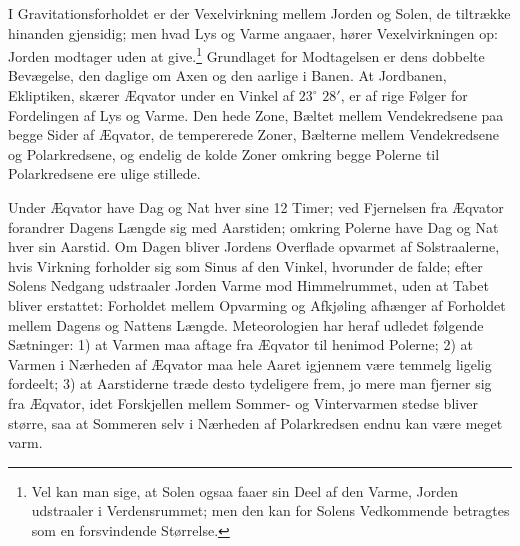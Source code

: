 \documentclass[12pt,a4paper]{book}
\begin{document}
I Gravitationsforholdet er der Vexelvirkning mellem Jorden og Solen, de
tiltrække hinanden gjensidig; men hvad Lys og Varme angaaer, hører
Vexelvirkningen op: Jorden modtager uden at give.\footnote{Vel kan man
sige, at Solen ogsaa faaer sin Deel af den Varme, Jorden udstraaler i
Verdensrummet; men den kan for Solens Vedkommende betragtes som en
forsvindende Størrelse.} Grundlaget for Modtagelsen er dens dobbelte
Bevægelse, den daglige om Axen og den aarlige i Banen. At Jordbanen,
Ekliptiken, skærer Æqvator
under en Vinkel af $23^{\circ}$ $28'$, er af rige Følger for Fordelingen af
Lys og Varme. Den hede Zone, Bæltet mellem Vendekredsene paa begge Sider
af Æqvator, de tempererede Zoner, Bælterne mellem Vendekredsene og
Polarkredsene, og endelig de kolde Zoner omkring begge Polerne til
Polarkredsene ere ulige stillede.

Under Æqvator have Dag og Nat hver sine 12 Timer; ved Fjernelsen fra
Æqvator forandrer Dagens Længde sig med Aarstiden; omkring Polerne have
Dag og Nat hver sin Aarstid. Om Dagen bliver Jordens Overflade opvarmet
af Solstraalerne, hvis Virkning forholder sig som Sinus af den Vinkel,
hvorunder de falde; efter Solens Nedgang udstraaler Jorden Varme mod
Himmelrummet, uden at Tabet bliver erstattet: Forholdet mellem Opvarming
og Afkjøling afhænger af Forholdet mellem Dagens og Nattens Længde.
Meteorologien har heraf udledet følgende Sætninger: 1) at Varmen maa
aftage fra Æqvator til henimod Polerne; 2) at Varmen i Nærheden af Æqvator
maa hele Aaret igjennem være temmelg ligelig fordeelt; 3) at Aarstiderne
træde desto tydeligere frem, jo mere man fjerner sig fra Æqvator, idet
Forskjellen mellem Sommer- og Vintervarmen stedse bliver større, saa at
Sommeren selv i Nærheden af Polarkredsen endnu kan være meget varm.
\end{document}
